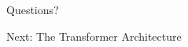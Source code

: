\documentclass[aspectratio=169]{beamer}
\begin{document}
\begin{frame}
\begin{center}
\vspace{2cm}
{\Huge \textcolor{popblue}{Questions?}}

\vspace{1cm}
{\large Next: The Transformer Architecture}
\end{center}
\end{frame}
\end{document}
